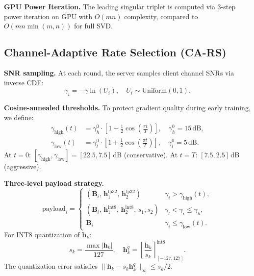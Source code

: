 \documentclass[conference]{IEEEtran}
\begin{document}
\textbf{GPU Power Iteration.} The leading singular triplet is computed via 3-step power iteration on GPU with $O(mn)$ complexity, compared to $O(mn\min(m,n))$ for full SVD.

\subsection{Channel-Adaptive Rate Selection (CA-RS)}

\textbf{SNR sampling.} At each round, the server samples client channel SNRs via inverse CDF:
\begin{equation}
    \gamma_i = -\overline{\gamma}\ln(U_i), \quad U_i \sim \mathrm{Uniform}(0,1).
\end{equation}

\textbf{Cosine-annealed thresholds.} To protect gradient quality during early training, we define:
\begin{align}
    \gamma_{\mathrm{high}}(t) &= \gamma_h^0\!\cdot\!\left[1 + \tfrac{1}{2}\cos\!\left(\tfrac{\pi t}{T}\right)\right], \quad \gamma_h^0 = 15\,\text{dB}, \\
    \gamma_{\mathrm{low}}(t) &= \gamma_l^0\!\cdot\!\left[1 + \tfrac{1}{2}\cos\!\left(\tfrac{\pi t}{T}\right)\right], \quad \gamma_l^0 = 5\,\text{dB}.
\end{align}
At $t=0$: $[\gamma_{\mathrm{high}}, \gamma_{\mathrm{low}}] = [22.5, 7.5]$\,dB (conservative). At $t=T$: $[7.5, 2.5]$\,dB (aggressive).

\textbf{Three-level payload strategy.}
\begin{equation}
    \text{payload}_i = \begin{cases}
        \left(\mathbf{B}_i,\, \mathbf{h}_1^{\mathrm{fp32}},\, \mathbf{h}_2^{\mathrm{fp32}}\right) & \gamma_i > \gamma_{\mathrm{high}}(t), \\[4pt]
        \left(\mathbf{B}_i,\, \mathbf{h}_1^{\mathrm{int8}},\, \mathbf{h}_2^{\mathrm{int8}},\, s_1, s_2\right) & \gamma_l < \gamma_i \leq \gamma_h, \\[4pt]
        \mathbf{B}_i & \gamma_i \leq \gamma_{\mathrm{low}}(t).
    \end{cases}
    \label{eq:payload}
\end{equation}
For INT8 quantization of $\mathbf{h}_k$:
\begin{equation}
    s_k = \frac{\max|\mathbf{h}_k|}{127}, \quad \mathbf{h}_k^q = \left\lfloor\frac{\mathbf{h}_k}{s_k}\right\rceil_{\![-127,127]}^{\mathrm{int8}}.
\end{equation}
The quantization error satisfies $\|\mathbf{h}_k - s_k \mathbf{h}_k^q\|_\infty \leq s_k/2$.
\end{document}
